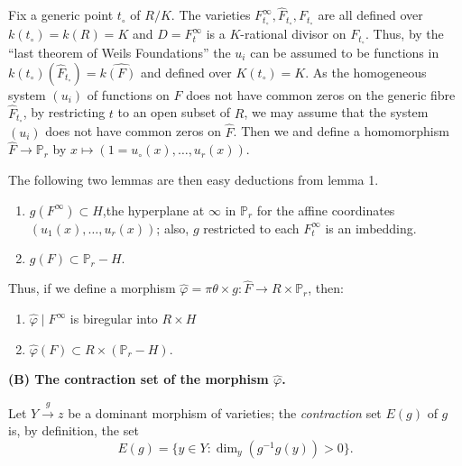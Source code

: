 Fix a generic point $t_\circ$ of $R/K$. The varieties $
F^\infty_{t_\circ}, \hat{F}_{t_\circ}, F_{t_\circ}$ are all
defined over $k(t_\circ) = k(R) = K$ and $D = F^\infty_t$ is a
$K$-rational divisor on $F_{t_\circ}$. Thus, by the ``last theorem of
Weils Foundations'' the $ u_i$ can be assumed to be functions in $
k(t_\circ)(\hat{F}_{t_\circ}) = k\hat{(F)}$ and defined over $
K(t_\circ) = K$. As the homogeneous system $(u_i)$ of functions on
$\hat{F}$ does not have common zeros on the generic fibre $
\hat{F}_{t_\circ}$, by restricting $t$ to an open subset of $R$, we
may assume that the system $ (u_i)$ does not have common zeros on $
\hat{F}$. Then we and define a homomorphism $ \hat{F}
\rightarrow \mathbb{P}_r$ by $ x \longmapsto (1 = u_\circ(x), \ldots ,
u_r(x))$. 

The following two lemmas are then easy deductions from lemma 1.
\begin{lemma}\label{chap3:sec2:lem2}%
  \begin{enumerate}[\rm (i)] 
  \item $g(F^\infty) \subset H$,\pageoriginale the hyperplane at $\infty$ in
    $\mathbb{P}_r$ for the affine coordinates $(u_1(x), \ldots ,
    u_r(x))$; also, $g$ restricted to each $F^{\infty}_t$ is an
    imbedding. 
  \item $g(F) \subset \mathbb{P}_r -H.$
  \end{enumerate}
\end{lemma}

Thus, if we define a morphism $\hat{\varphi}=\pi \theta \times g :
\hat{F}\rightarrow R \times \mathbb{P}_r$, then: 
\begin{lemma}\label{chap3:sec2:lem3}%
  \begin{enumerate}[\rm (i)]
  \item  $\hat{\varphi} \mid F^\infty$ is biregular into $ R \times H$
  \item $\hat{\varphi} (F) \subset R \times (\mathbb{P}_r -H)$.
  \end{enumerate}
\end{lemma}

\noindent
\textbf{(B) The contraction set of the morphism {\boldmath $\hat{\varphi}$.}}

\begin{defi*}%
  Let $ Y \overset{g}\longrightarrow z$ be a dominant morphism of
  varieties; the {\em contraction} set $E(g)$ of $g$ is, by
  definition, the set 
  $$ 
  E(g) = \bigg\{ y \in Y : \dim_y(g^{-1} g(y))>0\bigg\}.
  $$ 
\end{defi*}

